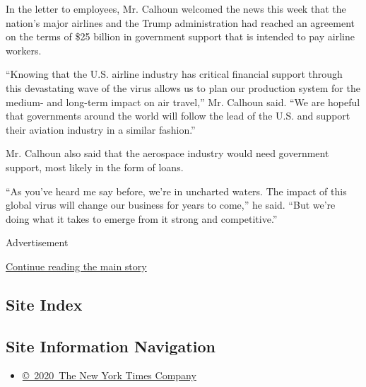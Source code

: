 In the letter to employees, Mr. Calhoun welcomed the news this week that
the nation's major airlines and the Trump administration had reached an
agreement on the terms of \$25 billion in government support that is
intended to pay airline workers.

``Knowing that the U.S. airline industry has critical financial support
through this devastating wave of the virus allows us to plan our
production system for the medium- and long-term impact on air travel,''
Mr. Calhoun said. ``We are hopeful that governments around the world
will follow the lead of the U.S. and support their aviation industry in
a similar fashion.''

Mr. Calhoun also said that the aerospace industry would need government
support, most likely in the form of loans.

``As you've heard me say before, we're in uncharted waters. The impact
of this global virus will change our business for years to come,'' he
said. ``But we're doing what it takes to emerge from it strong and
competitive.''

Advertisement

\protect\hyperlink{after-bottom}{Continue reading the main story}

\hypertarget{site-index}{%
\subsection{Site Index}\label{site-index}}

\hypertarget{site-information-navigation}{%
\subsection{Site Information
Navigation}\label{site-information-navigation}}

\begin{itemize}
\tightlist
\item
  \href{https://help.nytimes3xbfgragh.onion/hc/en-us/articles/115014792127-Copyright-notice}{©~2020~The
  New York Times Company}
\end{itemize}

